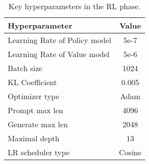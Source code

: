 \begin{table}[h]
\centering
\caption{Key hyperparameters in the RL phase.}
\label{tab:rl_params} 
\begin{tabular}{@{}lc@{}}
\toprule
\textbf{Hyperparameter}       & \textbf{Value} \\ \midrule
Learning Rate of Policy model & 5e-7           \\
Learning Rate of Value model  & 5e-6           \\
Batch size                    & 1024           \\
KL Coefficient                & 0.005          \\
Optimizer type                & Adam           \\
Prompt max len                & 4096           \\
Generate max len              & 2048           \\
Maximal depth                 & 13             \\
LR scheduler type             & Cosine         \\ \bottomrule
\end{tabular}
\end{table}